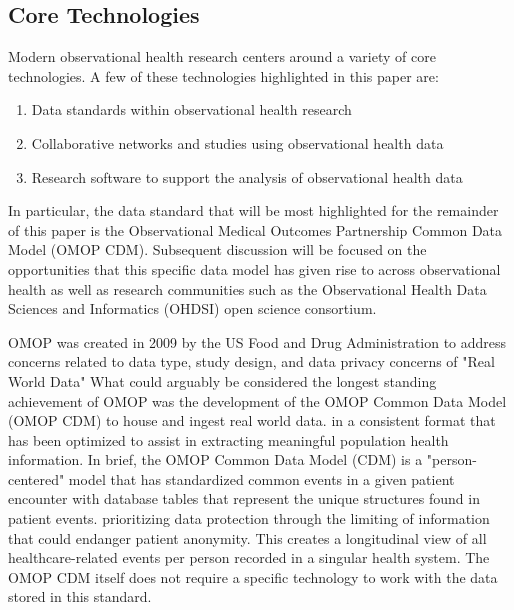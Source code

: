 \documentclass{juliacon}
\begin{document}
\subsection{Core Technologies}

Modern observational health research centers around a variety of core technologies.
A few of these technologies highlighted in this paper are:

\begin{enumerate}

\item Data standards within observational health research
\item Collaborative networks and studies using observational health data
\item Research software to support the analysis of observational health data

\end{enumerate}

In particular, the data standard that will be most highlighted for the remainder of this paper is the Observational Medical Outcomes Partnership Common Data Model (OMOP CDM).
Subsequent discussion will be focused on the opportunities that this specific data model has given rise to across observational health as well as research communities such as the Observational Health Data Sciences and Informatics (OHDSI) open science consortium.

OMOP was created in 2009 by the US Food and Drug Administration to address concerns related to data type, study design, and data privacy concerns of "Real World Data" \cite{ohdsi2019book} \cite{FDARealWorldEvidence}
What could arguably be considered the longest standing achievement of OMOP was the development of the OMOP Common Data Model (OMOP CDM) to house and ingest real world data.
in a consistent format that has been optimized to assist in extracting meaningful population health information.
In brief, the OMOP Common Data Model (CDM) is a "person-centered" model that has standardized common events in a given patient encounter with database tables that represent the unique structures found in patient events.
prioritizing data protection through the limiting of information that could endanger patient anonymity.
This creates a longitudinal view of all healthcare-related events per person recorded in a singular health system.
The OMOP CDM itself does not require a specific technology to work with the data stored in this standard.
\end{document}
